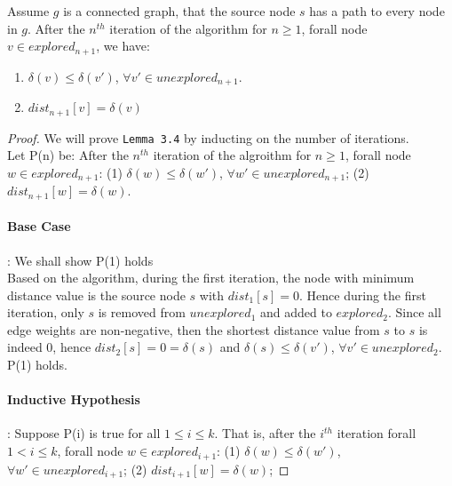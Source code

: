 

\begin{sublemma}
Assume $g$ is a connected graph, that the source node $s$ has a path to every node in $g$. After the $n^{th}$ iteration of the algorithm for $n \geq 1$, forall node $v \in explored_{n+1}$, we have:
\begin{enumerate}
  \item $\delta(v) \leq \delta(v')$, $\forall v' \in unexplored_{n+1}$.
  \item $dist_{n+1}[v] = \delta(v)$
\end{enumerate}
\end{sublemma}
\begin{proof}
We will prove \texttt{Lemma 3.4} by inducting on the number of iterations. 
\\
Let P(n) be: After the $n^{th}$ iteration of the algroithm for $n \geq 1$, forall node $w \in explored_{n+1}$: (1) $\delta(w) \leq \delta(w')$, $\forall w' \in unexplored_{n+1}$; (2) $dist_{n+1}[w] = \delta(w)$. 


\paragraph*{Base Case}: We shall show P(1) holds \\
Based on the algorithm, during the first iteration, the node with minimum distance value is the source node $s$ with $dist_1[s] = 0$. Hence during the first iteration, only $s$ is removed from $unexplored_1$ and added to $explored_2$. Since all edge weights are non-negative, then the shortest distance value from $s$ to $s$ is indeed $0$, hence $dist_2[s] = 0 = \delta(s)$ and $\delta(s) \leq \delta(v')$, $\forall v' \in unexplored_2$. 
\\
P(1) holds.



\paragraph*{Inductive Hypothesis}: Suppose P(i) is true for all $1 \leq i \leq k$. That is, after the $i^{th}$ iteration forall $1 < i \leq k$, forall node $w \in explored_{i+1}$: (1) $\delta(w) \leq \delta(w')$, $\forall w' \in unexplored_{i+1}$; (2) $dist_{i+1}[w] = \delta(w)$; %



\end{proof}
